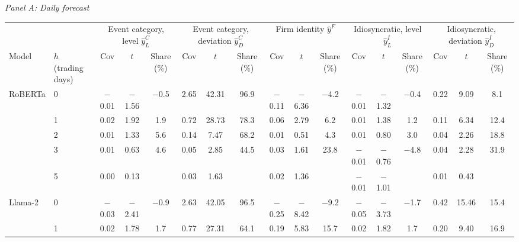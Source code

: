 \begin{table}[htbp]
{\footnotesize
\textit{Panel A: Daily forecast}\\[2pt]
\begin{adjustbox}{max width=\linewidth, max totalheight=0.15\textheight}
\begin{tabular}{llccccccccccccccc}
\toprule
\multicolumn{2}{c}{} & \multicolumn{3}{c}{Event category, level $\hat y^C_L$} & \multicolumn{3}{c}{Event category, deviation $\hat y^C_D$} & \multicolumn{3}{c}{Firm identity $\hat y^F$} & \multicolumn{3}{c}{Idiosyncratic, level $\hat y^I_L$} & \multicolumn{3}{c}{Idiosyncratic, deviation $\hat y^I_D$} \\
\cmidrule(lr){3-5} \cmidrule(lr){6-8} \cmidrule(lr){9-11} \cmidrule(lr){12-14} \cmidrule(lr){15-17}
Model & $h$ (trading days) & Cov & $t$ & Share (\%) & Cov & $t$ & Share (\%) & Cov & $t$ & Share (\%) & Cov & $t$ & Share (\%) & Cov & $t$ & Share (\%) \\
\midrule
RoBERTa & 0 & $-$0.01 & $-$1.56 & $-$0.5 & 2.65 & 42.31 & 96.9 & $-$0.11 & $-$6.36 & \phantom{0}$-$4.2 & $-$0.01 & $-$1.32 & \phantom{0}$-$0.4 & 0.22 & \phantom{0}9.09 & \phantom{0}8.1 \\
 & 1 & \phantom{$-$}0.02 & \phantom{$-$}1.92 & \phantom{$-$}1.9 & 0.72 & 28.73 & 78.3 & \phantom{$-$}0.06 & \phantom{$-$}2.79 & \phantom{$-$0}6.2 & \phantom{$-$}0.01 & \phantom{$-$}1.38 & \phantom{$-$0}1.2 & 0.11 & \phantom{0}6.34 & 12.4 \\
 & 2 & \phantom{$-$}0.01 & \phantom{$-$}1.33 & \phantom{$-$}5.6 & 0.14 & \phantom{0}7.47 & 68.2 & \phantom{$-$}0.01 & \phantom{$-$}0.51 & \phantom{$-$0}4.3 & \phantom{$-$}0.01 & \phantom{$-$}0.80 & \phantom{$-$0}3.0 & 0.04 & \phantom{0}2.26 & 18.8 \\
 & 3 & \phantom{$-$}0.01 & \phantom{$-$}0.63 & \phantom{$-$}4.6 & 0.05 & \phantom{0}2.85 & 44.5 & \phantom{$-$}0.03 & \phantom{$-$}1.61 & \phantom{$-$}23.8 & $-$0.01 & $-$0.76 & \phantom{0}$-$4.8 & 0.04 & \phantom{0}2.28 & 31.9 \\
 & 5 & \phantom{$-$}0.00 & \phantom{$-$}0.13 &  & 0.03 & \phantom{0}1.63 &  & \phantom{$-$}0.02 & \phantom{$-$}1.36 &  & $-$0.01 & $-$1.01 &  & 0.01 & \phantom{0}0.43 &  \\
\midrule
Llama-2 & 0 & $-$0.03 & $-$2.41 & $-$0.9 & 2.63 & 42.05 & 96.5 & $-$0.25 & $-$8.42 & \phantom{0}$-$9.2 & $-$0.05 & $-$3.73 & \phantom{0}$-$1.7 & 0.42 & 15.46 & 15.4 \\
 & 1 & \phantom{$-$}0.02 & \phantom{$-$}1.78 & \phantom{$-$}1.7 & 0.77 & 27.31 & 64.1 & \phantom{$-$}0.19 & \phantom{$-$}5.83 & \phantom{$-$}15.7 & \phantom{$-$}0.02 & \phantom{$-$}1.82 & \phantom{$-$0}1.7 & 0.20 & \phantom{0}9.40 & 16.9 \\

\end{tabular}
\end{adjustbox}}
\end{table}

